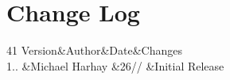 \chapter{Change Log }
\hypertarget{changelog}{}\label{changelog}

\begin{DoxyTable}{4}{}{}{1}
Version&Author&Date&Changes \\
1.. &Michael Harhay &26// &Initial Release \\
\end{DoxyTable}
